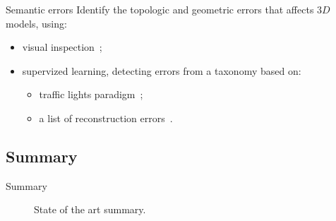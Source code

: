 \documentclass{beamer}
\begin{document}
            \begin{frame}{Semantic errors}
                Identify the topologic and geometric errors that affects $3D$ models, using:
                \begin{itemize}[label=$\blacktriangleright$, font=\color{IGNGreen}]
                    \item<1-> visual inspection~\cite{OudeElberink2010};
                    \item<2-> supervized learning, detecting errors from a taxonomy based on:
                    \begin{itemize}[label=--]
                        \item<3-> traffic lights paradigm~\cite{boudet2006supervised};
                        \item<4-> a list of reconstruction errors~\cite{Michelin2013}.
                    \end{itemize}
                \end{itemize}
            \end{frame}
        \subsection{Summary}
            \begin{frame}[plain]{Summary}
                \begin{figure}
                    
                    \caption{\label{fig::bib_summary} State of the art summary.}
                \end{figure}
            \end{frame}
\end{document}
